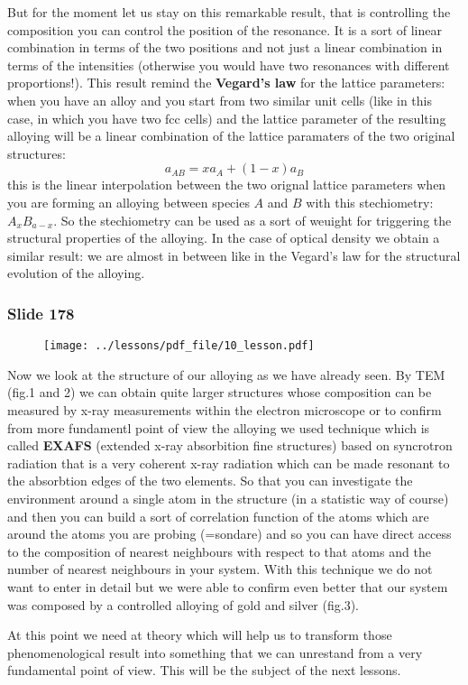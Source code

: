\documentclass[../main/main.tex]{subfiles}
\begin{document}
But for the moment let us stay on this remarkable result, that is controlling the composition you can control the position of the resonance. It is a sort of linear combination in terms of the two positions and not just a linear combination in terms of the  intensities (otherwise you would have two resonances with different proportions!). This result remind the \textbf{Vegard's law} for the lattice parameters: when you have an alloy and you start from two similar unit cells (like in this case, in which you have two fcc cells) and the lattice parameter of the resulting alloying will be a linear combination of the lattice paramaters of the two original structures:
\begin{equation*}
  a_{AB} = x a_A + (1-x)a_B
\end{equation*}
this is the linear interpolation between the two orignal lattice parameters when you are forming an alloying between species \( A \) and \( B \) with this stechiometry: \( A_xB_{a-x} \). So the stechiometry can be used as a sort of weuight for triggering the structural properties of the alloying.
In the case of optical density we obtain a similar result: we are almost in between like in the Vegard's law for the structural evolution of the alloying.

\newpage

\subsubsection{Slide 178}

\begin{figure}[h!]
\centering
\texttt{[image: ../lessons/pdf\_file/10\_lesson.pdf]}
\end{figure}

Now we look at the structure of our alloying as we have already seen. By TEM (fig.1 and 2) we can obtain quite larger structures whose composition can be measured by x-ray measurements within the electron microscope or to confirm from more fundamentl point of view the alloying we used technique which is called \textbf{EXAFS} (extended x-ray absorbition fine structures) based on syncrotron radiation that is a very coherent x-ray radiation which can be made resonant to the absorbtion edges of the two elements. So that you can investigate the environment around a single atom in the structure (in a statistic way of course) and then you can build a sort of correlation function of the atoms which are around the atoms you are probing (=sondare) and so you can have direct access to the composition of nearest neighbours with respect to that atoms and the number of nearest neighbours in your system. With this technique we do not want to enter in detail but we were able to confirm even better that our system was composed by a controlled alloying of gold and silver (fig.3).

At this point we need at theory which will help us to transform those phenomenological result into something that we can unrestand from a very fundamental point of view. This will be the subject of the next lessons.

\clearpage
\end{document}
